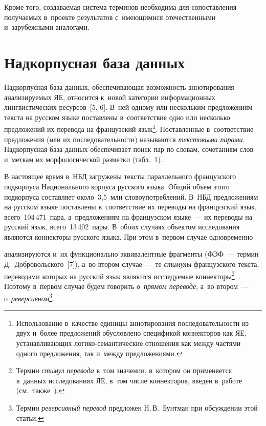 \begin{multicols}{2}
Кроме того, создаваемая система 
терминов необходима для сопоставления получаемых в~проекте результатов 
с~имеющимися отечественными и~зарубежными аналогами.

\section{Надкорпусная база данных}

    Надкорпусная база данных, обеспечивающая возможность 
аннотирования анализируемых ЯЕ, относится к~новой категории 
информационных лингвистических ресурсов~[5, 6]. В~ней одному или 
нескольким предложениям текста на русском языке поставлены в~соответствие 
одно или несколько предложений их перевода на французский 
язык\footnote{Использование в~качестве единицы аннотирования последовательности из двух 
и~более предложений обусловлено спецификой коннекторов как ЯЕ, 
устанавливающих ло\-ги\-ко-се\-ман\-ти\-че\-ские отношения как между частями одного 
предложения, так и~между предложениями.}. Поставленные в~соответствие предложения 
(или их последовательности) называются \textit{текстовыми парами}. Надкорпусная
база данных 
обеспечивает поиск пар по словам, сочетаниям слов и~меткам их 
морфологической разметки (табл.~1).
    

     
    В настоящее время в~НБД загружены тексты параллельного французского 
подкорпуса Национального корпуса русского языка. Общий объем 
этого подкорпуса составляет около~3,5~млн сло\-во\-упо\-треб\-ле\-ний. В~НБД 
предложениям на русском языке поставлены в~соответствие их переводы на 
французский язык, всего~104\,471~пара, а~предложениям на французском 
языке~--- их переводы на русский язык, всего~13\,402~пары. В~обоих случаях 
объектом исследования являются коннекторы русского языка. При этом 
в~первом случае одновременно\linebreak %

\columnbreak

\noindent
 анализируются и~их функционально 
эквивалентные фрагменты (ФЭФ~--- термин Д.~Добровольского~[7]), а~во 
втором случае~--- те \textit{стимулы} французского текста, переводами 
которых на русский язык являются исследуемые коннекторы\footnote{Термин 
\textit{стимул перевода} в~том значении, в~котором он применяется в~данных исследованиях 
ЯЕ, в~том числе коннекторов, введен в~работе~\cite{8-zat} (см.\  
также~\cite{2-zat, 9-zat}).}~\cite{2-zat, 8-zat, 9-zat}. Поэтому в~первом случае будем 
говорить о~\textit{прямом переводе}, а~во втором~--- 
о~\textit{реверсивном}\footnote{ Термин \textit{реверсивный перевод} предложен 
Н.\,В.~Бунтман при обсуждении этой статьи.}.
    

\end{multicols}
